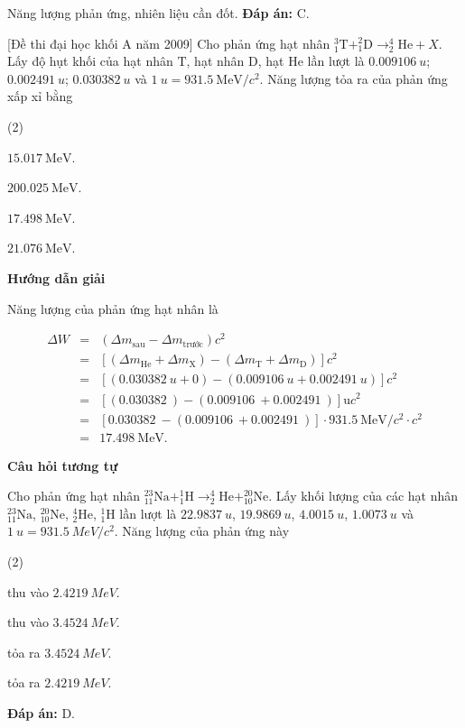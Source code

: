 \begin{dang}{Năng lượng phản ứng, nhiên liệu cần đốt.}
{		\textbf{Đáp án:} C.
		}
		{
		[Đề thi đại học khối A năm 2009] Cho phản ứng hạt nhân $^3_1\text{T} + ^2_1 \text{D} \rightarrow ^4_2\text{He} + X$. Lấy độ hụt khối của hạt nhân $\text{T}$, hạt nhân $\text{D}$, hạt $\text{He}$ lần lượt là $\SI{0,009106}{u}$; $\SI{0,002491}{u}$; $\SI{0,030382}{u}$ và $\SI{1}{u}=\SI{931,5}{\mega\electronvolt/c^2}$. Năng lượng tỏa ra của phản ứng xấp xỉ bằng
		
		\begin{mcq}(2)
			\item $\SI{15,017}{\mega\electronvolt}$.
			\item $\SI{200,025}{\mega\electronvolt}$.
			\item $\SI{17,498}{\mega\electronvolt}$.
			\item $\SI{21,076}{\mega\electronvolt}$.
		\end{mcq}
		}
		{\begin{center}
			\textbf{Hướng dẫn giải}
		\end{center}
		
		Năng lượng của phản ứng hạt nhân là
		
		\begin{eqnarray*}
		\Delta W &=& \left(\Delta m_\text{sau} - \Delta m_\text{trước}\right) c^2 \\
		&=& \left[\left(\Delta m_\text{He} + \Delta m_\text{X} \right) -  \left(\Delta m_\text{T} + \Delta m_\text{D}\right)\right] c^2\\
		&=& \left[\left(\SI{0,030382}{u} + 0 \right) -  \left(\SI{0,009106}{u} + \SI{0,002491}{u}\right)\right] c^2\\
		&=& \left[\left(\SI{0,030382}{} \right) -  \left(\SI{0,009106}{} + \SI{0,002491}{}\right)\right] \text{u} c^2\\
		&=& \left[\SI{0,030382}{}  -  \left(\SI{0,009106}{} + \SI{0,002491}{}\right)\right] \cdot\SI{931,5}{\mega\electronvolt/c^2}\cdot c^2\\
		&=&\SI{17,498}{\mega\electronvolt}.
		\end{eqnarray*}
		
		\begin{center}
			\textbf{Câu hỏi tương tự}
		\end{center}
		
Cho phản ứng hạt nhân $^{23}_{11} \text{Na} + ^{1}_{1} \text{H} \longrightarrow ^{4}_{2} \text{He} + ^{20}_{10} \text{Ne}$. Lấy khối lượng của các hạt nhân $^{23}_{11} \text{Na}$, $^{20}_{10} \text{Ne}$, $^{4}_{2} \text{He}$, $^{1}_{1} \text{H}$ lần lượt là $\SI{22.9837}{u}$, $\SI{19.9869}{u}$, $\SI{4.0015}{u}$, $\SI{1.0073}{u}$ và $\SI{1}{u} = \SI{931.5}{MeV/c^2}$. Năng lượng của phản ứng này
	\begin{mcq}(2)
		\item thu vào $\SI{2.4219}{MeV}$.
		\item thu vào $\SI{3.4524}{MeV}$.
		\item tỏa ra $\SI{3.4524}{MeV}$.
		\item tỏa ra $\SI{2.4219}{MeV}$.
	\end{mcq}
		\textbf{Đáp án:} D.
		}

	\end{dang}
	
